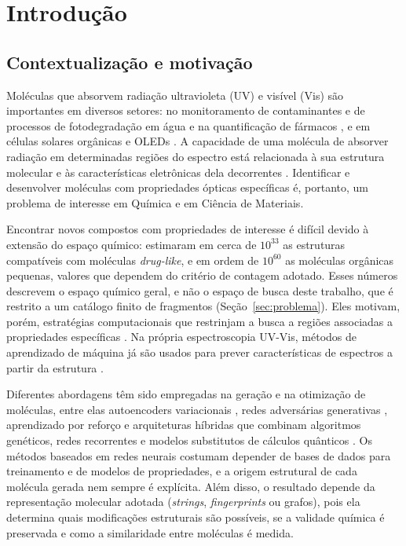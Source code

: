 \chapter{Introdução}
\label{cap:introducao}

\section{Contextualização e motivação}
\label{sec:contextualizacao}

Moléculas que absorvem radiação ultravioleta (UV) e visível (Vis) são importantes em diversos setores: no monitoramento de contaminantes e de processos de fotodegradação em água e na quantificação de fármacos \cite{rocha_2018}, e em células solares orgânicas e OLEDs \cite{ostroverkhova_2016}. A capacidade de uma molécula de absorver radiação em determinadas regiões do espectro está relacionada à sua estrutura molecular e às características eletrônicas dela decorrentes \cite{atkins_depaula_2018,silverstein_2006}. Identificar e desenvolver moléculas com propriedades ópticas específicas é, portanto, um problema de interesse em Química e em Ciência de Materiais.

Encontrar novos compostos com propriedades de interesse é difícil devido à extensão do espaço químico:  estimaram em cerca de $10^{33}$ as estruturas compatíveis com moléculas \textit{drug-like}, e  em ordem de $10^{60}$ as moléculas orgânicas pequenas, valores que dependem do critério de contagem adotado. Esses números descrevem o espaço químico geral, e não o espaço de busca deste trabalho, que é restrito a um catálogo finito de fragmentos (Seção~\ref{sec:problema}). Eles motivam, porém, estratégias computacionais que restrinjam a busca a regiões associadas a propriedades específicas \cite{tkatchenko_2020}. Na própria espectroscopia UV-Vis, métodos de aprendizado de máquina já são usados para prever características de espectros a partir da estrutura \cite{mamede_2021}.

Diferentes abordagens têm sido empregadas na geração e na otimização de moléculas, entre elas autoencoders variacionais \cite{gomez_bombarelli_2018,jin_2018}, redes adversárias generativas \cite{guimaraes_2017,decao_kipf_2018}, aprendizado por reforço \cite{olivecrona_2017,you_2018} e arquiteturas híbridas que combinam algoritmos genéticos, redes recorrentes e modelos substitutos de cálculos quânticos \cite{kwon_2021}. Os métodos baseados em redes neurais costumam depender de bases de dados para treinamento e de modelos de propriedades, e a origem estrutural de cada molécula gerada nem sempre é explícita. Além disso, o resultado depende da representação molecular adotada (\textit{strings}, \textit{fingerprints} ou grafos), pois ela determina quais modificações estruturais são possíveis, se a validade química é preservada e como a similaridade entre moléculas é medida.

